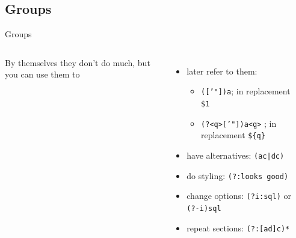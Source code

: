 \documentclass[english,aspectratio=169]{beamer}
\begin{document}
\subsection{Groups}
\begin{frame}{Groups}
\begin{columns}
        By themselves they don't do much, but you can use them to
        \begin{itemize}
            \item later refer to them: \\
            \begin{itemize}
                \item \texttt{(['"])a\string\1}; in replacement \texttt{\$1}
                \item \texttt{(?<q>['"])a\string\k<q>} \textdagger{}; in replacement \texttt{\$\{q\}} \textdagger{} \cite{CIUnamedGroups}
            \end{itemize}
            \item have alternatives: \texttt{(ac|dc)}
            \item do styling: \texttt{(?:looks good\string\?)}
            \item change options: \texttt{(?i:sql)} or \texttt{(?-i)sql}
            \item repeat sections: \texttt{(?:[ad]c)*}
        \end{itemize}
        \begin{center}
        \end{center}
\end{columns}
\end{frame}
\end{document}

